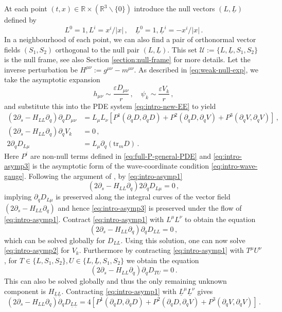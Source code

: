 \documentclass[11pt, a4paper]{amsart}
\numberwithin{equation}{section}
\numberwithin{theorem}{section}
\newcommand{\R}{\mathbb{R}}
\newcommand{\p}{\partial}
\newcommand{\mn}{{\mu \nu}}
\newcommand{\lbar}{\underline{L}}
\newcommand{\tr}{\text{tr}}
\newcommand{\U}{\mathcal{U}}
\begin{document}
At each point $(t,x) \in \R \times (\R^3 \backslash \{ 0 \} )$ introduce the null vectors $(L, \lbar)$ defined by
$$ L^0 = 1, L^i = x^i / \vert x \vert \,, \quad \lbar^0 = 1, \lbar^i = - x^i / \vert x \vert \,. $$
In a neighbourhood of each point, we can also find a pair of orthonormal vector fields $(S_1, S_2)$ orthogonal to the null pair $(L, \lbar)$. This set $\U := \{ L, \lbar, S_1, S_2 \}$ is the null frame, see also Section \ref{section:null-frame} for more details. Let the inverse perturbation be
$ H^\mn := g^\mn - m^\mn$.
As described in \eqref{eq:weak-null-exp}, we take the asymptotic expansion 
$$h_\mn \sim \frac{\varepsilon D_\mn}{r} \,, \quad \psi_k \sim \frac{\varepsilon V_k}{r} \,,$$ 
and substitute this into the PDE system \eqref{eq:intro-new-EE} to yield
\begin{subequations} \label{eq:intro-gen-weaknull}
 \begin{align}
(2 \p_s - H_{LL} \p_q ) \p_q D_\mn &= L_\mu L_\nu \left[ P^1(\p_q D, \p_q D) + P^2 (\p_q D, \p_q V) + P^3 (\p_q V, \p_q V) \right] \label{eq:intro-asymp1} \,, \\
(2 \p_s - H_{LL} \p_q ) \p_q V_k &= 0 \label{eq:intro-asymp2} \,, \\
2\p_q D_{L \mu} &= L_\mu \p_q (\tr_m D) \,. \label{eq:intro-asymp3}
 \end{align}
\end{subequations}
Here $P^i$ are non-null terms defined in \eqref{eq:full-P-general-PDE} and \eqref{eq:intro-asymp3} is the asymptotic form of the wave-coordinate condition \eqref{eq:intro-wave-gauge}. Following the argument of \cite{lindblad:weaknull}, by \eqref{eq:intro-asymp1}
$$ (2 \p_s - H_{LL} \p_q) 2 \p_q D_{L \mu} = 0 \,,$$
implying $\p_q D_{L \mu}$ is preserved along the integral curves of the vector field $(2 \p_s - H_{LL} \p_q)$ and hence \eqref{eq:intro-asymp3} is preserved under the flow of \eqref{eq:intro-asymp1}. Contract \eqref{eq:intro-asymp1} with $L^\mu L^\nu$ to obtain the equation 
$$ (2 \p_s - H_{LL} \p_q ) \p_q D_{LL} = 0 \,, $$
which can be solved globally for $D_{LL}$. Using this solution, one can now solve \eqref{eq:intro-asymp2} for $V_k$. Furthermore by contracting \eqref{eq:intro-asymp1} with $T^\mu U^\nu$, for $T \in \{ L, S_1, S_2 \}, U \in \{ L,\lbar, S_1, S_2 \}$ we obtain the equation 
$$ (2 \p_s - H_{LL} \p_q ) \p_q D_{TU} = 0 \,.$$
This can also be solved globally and thus the only remaining unknown component is $H_{\lbar \lbar}$. Contracting \eqref{eq:intro-asymp1}  with $\lbar^\mu \lbar^\nu$ gives
$$ (2 \p_s - H_{LL} \p_q ) \p_q D_{\lbar \lbar} = 4 \left[ P^1(\p_q D, \p_q D) + P^2 (\p_q D, \p_q V) + P^3 (\p_q V, \p_q V) \right] \,.$$
\end{document}
